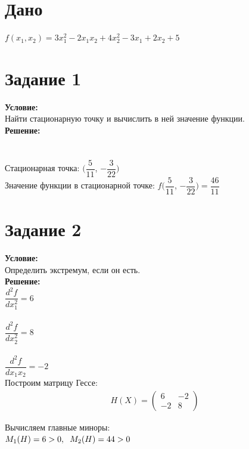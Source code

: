 \documentclass[14pt,a4paper,fleqn]{extarticle}
\begin{document}
	\section*{Дано}
	$f(x_1,x_2) = 3x_1^2 - 2x_1x_2 + 4x_2^2 - 3x_1 + 2x_2 + 5$
	\section*{Задание 1}
	\textbf{Условие:}\\
	Найти стационарную точку и вычислить в ней значение функции.\\
	
	\textbf{Решение:}\\
	
	\\\\

	Стационарная точка: $(\dfrac{5}{11}$, $-\dfrac{3}{22})$\\
	Значение функции в стационарной точке: $f(\dfrac{5}{11}$, $-\dfrac{3}{22}) = \dfrac{46}{11}$
	
	\section*{Задание 2}
	\textbf{Условие:}\\
	Определить экстремум, если он есть.\\

	\textbf{Решение:}\\
	
	$\dfrac{d^2f}{dx_1^2} = 6$\\\\
	$\dfrac{d^2f}{dx_2^2} = 8$\\\\
	$\dfrac{d^2f}{dx_1x_2} = -2$\\
	
	Построим матрицу Гессе:
	\begin{align*}
		H(X) = \begin{pmatrix}
			6 & -2\\
			-2 & 8
		\end{pmatrix}
	\end{align*}
	
	Вычисляем главные миноры:\\
	$M_1(H) = 6 > 0, \hspace*{0.2cm} M_2(H) = 44 > 0$\\
	
\end{document}
